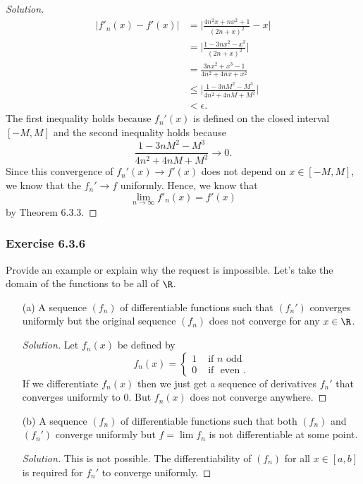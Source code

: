 \begin{enumerate}
\begin{proof}[Solution]
        \begin{align*}
            | f'_n(x) - f'(x)| &=  \Big| \frac{ 4n^2x + nx^2 + 1  }{ (2n+x)^2 } - x   \Big|  \\
                               &= \Big| \frac{ 1 - 3nx^2 - x^3  }{ (2n+x)^2 }  \Big| \\
                               &= \frac{ 3nx^2 + x^3 - 1  }{ 4n^2 + 4nx + x^2 } \\
                                &\leq \Big| \frac{ 1 - 3nM^2 - M^3  }{ 4n^2 + 4nM + M^2 }  \Big| \\ 
                                &< \epsilon.
        \end{align*}
        The first inequality holds because \( f_n'(x)  \) is defined on the closed interval \( [-M, M ] \) and the second inequality holds because 
        \[  \frac{ 1 - 3nM^2 - M^3   }{  4n^2 + 4nM + M^2  } \to 0.\]
        Since this convergence of \( f_n'(x) \to f'(x)  \) does not depend on \( x  \in [-M, M ] \), we know that the \( f_n' \to f  \) uniformly. Hence, we know that 
        \[  \lim_{ n \to \infty  } f'_n(x) = f'(x) \]
        by Theorem 6.3.3.
        \end{proof}
\end{enumerate}

\subsubsection{Exercise 6.3.6} Provide an example or explain why the request is impossible. Let's take the domain of the functions to be all of \( \R  \).

\begin{enumerate}
    \item[(a)] A sequence \( (f_n)  \) of differentiable functions such that \( (f_n') \) converges uniformly but the original sequence \( (f_n)  \) does not converge for any \( x \in \R  \).
        \begin{proof}[Solution]
        Let \( f_n(x)  \) be defined by 
        \[  f_n(x) = 
        \begin{cases}
            1 &\text{ if } n \text{~odd~} \\
            0 &\text{ if } \text{~even~}.
        \end{cases} \]
        If we differentiate \( f_n(x)  \) then we just get a sequence of derivatives \( f_n' \) that converges uniformly to \( 0  \). But \( f_n(x)  \) does not converge anywhere.
        \end{proof}
    \item[(b)] A sequence \( (f_n) \) of differentiable functions such that both \( (f_n)  \) and \( (f_n') \) converge uniformly but \( f = \lim f_n \) is not differentiable at some point.
        \begin{proof}[Solution]
            This is not possible. The differentiability of \( (f_n)   \) for all \( x \in [a,b]  \) is required for \( f_n' \) to converge uniformly.
        \end{proof}
\end{enumerate}

